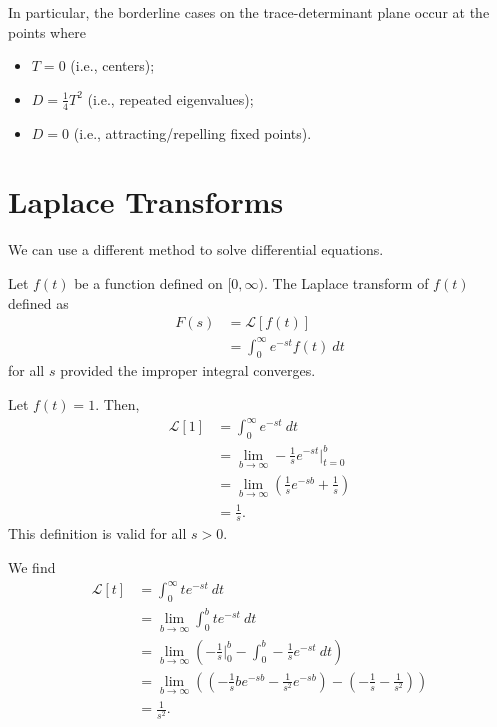 \documentclass[10pt]{mypackage}
\begin{document}
In particular, the borderline cases on the trace-determinant plane occur at the points where
\begin{itemize}
  \item $T = 0$ (i.e., centers);
  \item $D = \frac{1}{4}T^2$ (i.e., repeated eigenvalues);
  \item $D = 0$ (i.e., attracting/repelling fixed points).
\end{itemize}
\section{Laplace Transforms}%
We can use a different method to solve differential equations. 
\begin{definition}
  Let $f(t)$ be a function defined on $[0,\infty)$. The Laplace transform of $f(t)$ defined as
  \begin{align*}
    F(s) &= \mathcal{L}\left[f(t)\right]\\
         &= \int_{0}^{\infty} e^{-st}f(t)\:dt
  \end{align*}
  for all $s$ provided the improper integral converges.
\end{definition}
\begin{example}
  Let $f(t) = 1$. Then,
  \begin{align*}
    \mathcal{L}\left[1\right] &= \int_{0}^{\infty} e^{-st}\:dt\\
                              &= \lim_{b\rightarrow\infty}-\frac{1}{s}e^{-st}\bigr\vert_{t=0}^{b}\\
                              &= \lim_{b\rightarrow\infty}\left(\frac{1}{s}e^{-sb} + \frac{1}{s}\right)\\
                              &= \frac{1}{s}.
  \end{align*}
  This definition is valid for all $s > 0$.
\end{example}
\begin{example}
  We find
  \begin{align*}
    \mathcal{L}\left[t\right] &= \int_{0}^{\infty} te^{-st}\:dt\\
                              &= \lim_{b\rightarrow\infty}\int_{0}^{b} te^{-st}\:dt\\
                              &= \lim_{b\rightarrow\infty}\left(-\frac{1}{s}\bigr\vert_{0}^{b} - \int_{0}^{b} -\frac{1}{s}e^{-st}\:dt\right)\\
                              &= \lim_{b\rightarrow\infty}\left(\left(-\frac{1}{s}be^{-sb} - \frac{1}{s^2}e^{-sb}\right) - \left(-\frac{1}{s} - \frac{1}{s^2}\right)\right)\\
                              &= \frac{1}{s^2}.
  \end{align*}
  
\end{example}
\end{document}
